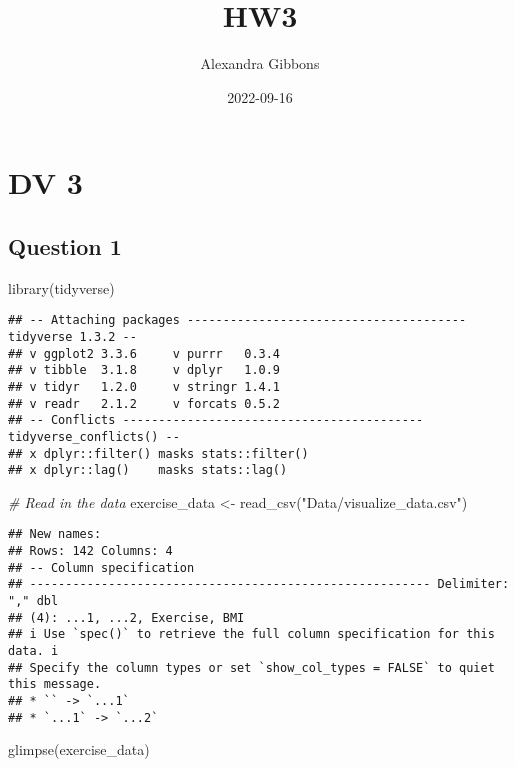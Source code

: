\documentclass[
]{article}
\title{HW3}
\author{Alexandra Gibbons}
\date{2022-09-16}
\newenvironment{Shaded}{\begin{snugshade}}{\end{snugshade}}
\newcommand{\CommentTok}[1]{\textcolor[rgb]{0.56,0.35,0.01}{\textit{#1}}}
\newcommand{\FunctionTok}[1]{\textcolor[rgb]{0.00,0.00,0.00}{#1}}
\newcommand{\NormalTok}[1]{#1}
\newcommand{\OtherTok}[1]{\textcolor[rgb]{0.56,0.35,0.01}{#1}}
\newcommand{\StringTok}[1]{\textcolor[rgb]{0.31,0.60,0.02}{#1}}
\begin{document}
\maketitle

\hypertarget{dv-3}{%
\section{DV 3}\label{dv-3}}

\hypertarget{question-1}{%
\subsection{Question 1}\label{question-1}}

\begin{Shaded}
\begin{Highlighting}[]
\FunctionTok{library}\NormalTok{(tidyverse)}
\end{Highlighting}
\end{Shaded}

\begin{verbatim}
## -- Attaching packages --------------------------------------- tidyverse 1.3.2 --
## v ggplot2 3.3.6     v purrr   0.3.4
## v tibble  3.1.8     v dplyr   1.0.9
## v tidyr   1.2.0     v stringr 1.4.1
## v readr   2.1.2     v forcats 0.5.2
## -- Conflicts ------------------------------------------ tidyverse_conflicts() --
## x dplyr::filter() masks stats::filter()
## x dplyr::lag()    masks stats::lag()
\end{verbatim}

\begin{Shaded}
\begin{Highlighting}[]
\CommentTok{\# Read in the data }
\NormalTok{exercise\_data }\OtherTok{\textless{}{-}} \FunctionTok{read\_csv}\NormalTok{(}\StringTok{"Data/visualize\_data.csv"}\NormalTok{)}
\end{Highlighting}
\end{Shaded}

\begin{verbatim}
## New names:
## Rows: 142 Columns: 4
## -- Column specification
## -------------------------------------------------------- Delimiter: "," dbl
## (4): ...1, ...2, Exercise, BMI
## i Use `spec()` to retrieve the full column specification for this data. i
## Specify the column types or set `show_col_types = FALSE` to quiet this message.
## * `` -> `...1`
## * `...1` -> `...2`
\end{verbatim}

\begin{Shaded}
\begin{Highlighting}[]
\FunctionTok{glimpse}\NormalTok{(exercise\_data)}
\end{Highlighting}
\end{Shaded}
\end{document}
